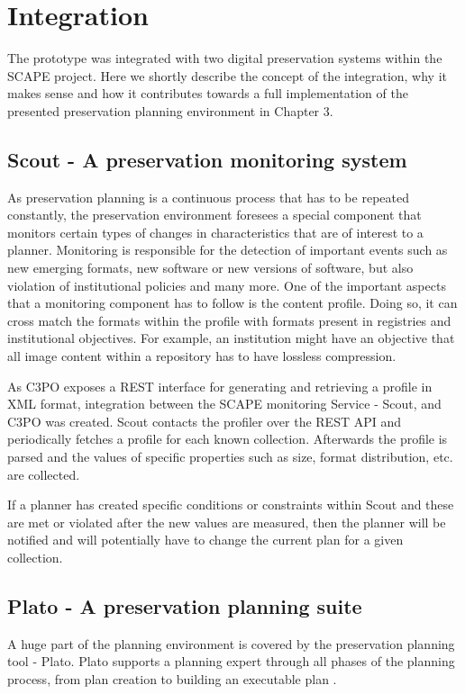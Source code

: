 \section{Integration}
The prototype was integrated with two digital preservation systems within the SCAPE project. Here we shortly describe the concept of the integration, why it makes sense and how it contributes towards a full implementation of the presented preservation planning environment in Chapter 3.

\subsection{Scout - A preservation monitoring system}
As preservation planning is a continuous process that has to be repeated constantly, the preservation environment
foresees a special component that monitors certain types of changes in characteristics that are of interest to a planner.
Monitoring is responsible for the detection of important events such as new emerging formats, new software or new versions of software, but also violation of institutional policies and many more. 
One of the important aspects that a monitoring component has to follow is the content profile. Doing so, it can cross match the formats within the profile with formats present in registries and institutional objectives. For example, an institution might have an objective that all image content within a repository has to have lossless compression.

As C3PO exposes a REST interface for generating and retrieving a profile in XML format, integration between the SCAPE monitoring Service - Scout, and C3PO was created. Scout contacts the profiler over the REST API and periodically fetches a profile for each known collection. Afterwards the profile is parsed and the values of specific properties such as size, format distribution, etc. are collected.

If a planner has created specific conditions or constraints within Scout and these are met or violated after the new values are measured, then the planner will be notified and will potentially have to change the current plan for a given collection.

\subsection{Plato - A preservation planning suite}
A huge part of the planning environment is covered by the preservation planning tool - Plato.
Plato supports a planning expert through all phases of the planning process, from plan creation to building an executable plan .

